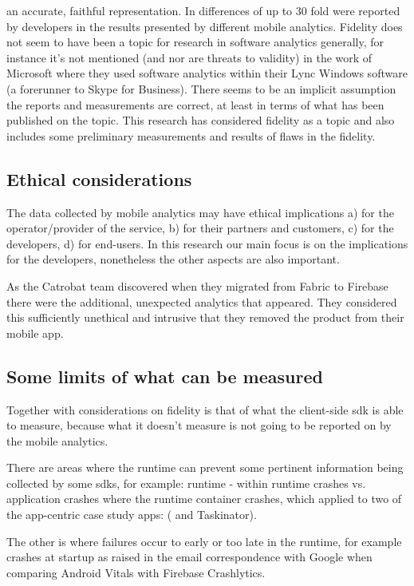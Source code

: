 an accurate, faithful representation. In  differences of up to 30 fold were reported by developers in the results presented by different mobile analytics. Fidelity does not seem to have been a topic for research in software analytics generally, for instance it's not mentioned (and nor are threats to validity) in the work of Microsoft where they used software analytics within their Lync Windows software (a forerunner to Skype for Business). There seems to be an implicit assumption the reports and measurements are correct, at least in terms of what has been published on the topic. This research has considered fidelity as a topic and also includes some preliminary measurements and results of flaws in the fidelity.


\subsection{Ethical considerations}
The data collected by mobile analytics may have ethical implications a) for the operator/provider of the service, b) for their partners and customers, c) for the developers, d) for end-users. In this research our main focus is on the implications for the developers, nonetheless the other aspects are also important.

As the Catrobat team discovered when they migrated from Fabric to Firebase there were the additional, unexpected analytics that appeared. They considered this sufficiently unethical and intrusive that they removed the product from their mobile app.


\subsection{Some limits of what can be measured}
Together with considerations on fidelity is that of what the client-side \Gls{sdk} is able to measure, because what it doesn't measure is not going to be reported on by the mobile analytics. 

There are areas where the runtime can prevent some pertinent information being collected by some \Glspl{sdk}, for example:  runtime - within runtime crashes vs. application crashes where the runtime container crashes, which applied to two of the app-centric case study apps: ( and Taskinator).

The other is where failures occur to early or too late in the runtime, for example crashes at startup as raised in the email correspondence with Google when comparing Android Vitals with Firebase Crashlytics.

